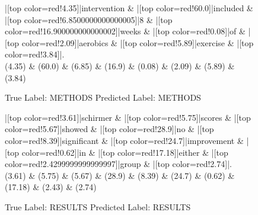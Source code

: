 \documentclass[a4paper, landscape]{article}
\begin{document}
\begin{figure}
\begin{center}
\begin{dependency}
\begin{deptext}
|[top color=red!4.35]|intervention \& |[top color=red!60.0]|included \& |[top color=red!6.8500000000000005]|8 \& |[top color=red!16.900000000000002]|weeks \& |[top color=red!0.08]|of \& |[top color=red!2.09]|aerobics \& |[top color=red!5.89]|exercise \& |[top color=red!3.84]|.\\
(4.35) \& (60.0) \& (6.85) \& (16.9) \& (0.08) \& (2.09) \& (5.89) \& (3.84)\\
\end{deptext}
\end{dependency}
\end{center}
\caption{True Label: METHODS Predicted Label: METHODS}
\end{figure}
\clearpage
\begin{figure}
\begin{center}
\begin{dependency}
\begin{deptext}
|[top color=red!3.61]|schirmer \& |[top color=red!5.75]|scores \& |[top color=red!5.67]|showed \& |[top color=red!28.9]|no \& |[top color=red!8.39]|significant \& |[top color=red!24.7]|improvement \& |[top color=red!0.62]|in \& |[top color=red!17.18]|either \& |[top color=red!2.4299999999999997]|group \& |[top color=red!2.74]|.\\
(3.61) \& (5.75) \& (5.67) \& (28.9) \& (8.39) \& (24.7) \& (0.62) \& (17.18) \& (2.43) \& (2.74)\\
\end{deptext}
\end{dependency}
\end{center}
\caption{True Label: RESULTS Predicted Label: RESULTS}
\end{figure}
\clearpage
\end{document}
